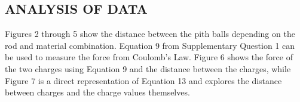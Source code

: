 \documentclass [12pt, letterpaper, twoside] {article}
\begin{document}
\begin{figure}
  \centering
  \qquad
\end{figure}

\subsection* {ANALYSIS OF DATA}
Figures 2 through 5 show the distance between the pith balls depending on the rod and material combination. Equation 9 from Supplementary Question 1 can be used to measure the force from Coulomb's Law. Figure 6 shows the force of the two charges using Equation 9 and the distance between the charges, while Figure 7 is a direct representation of Equation 13 and explores the distance between charges and the charge values themselves. \\
\end{document}
